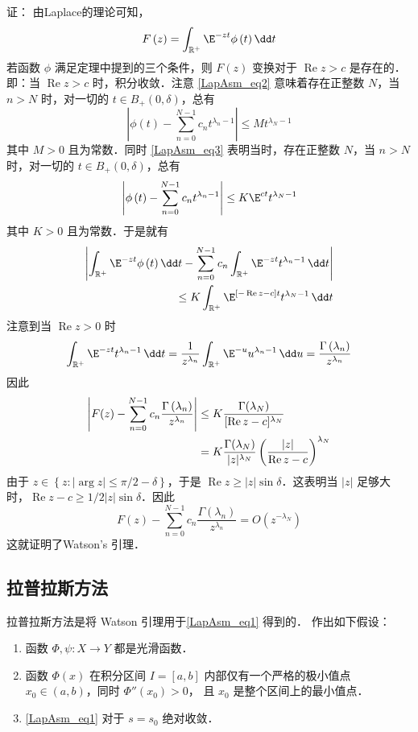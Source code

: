 证：
由Laplace的理论可知， 
\[
F\left(z\right)=\int_{\mathbb{R}^+}{\E^{-zt}\phi\left(t\right)}\,\dd t
\]
若函数 $\phi$ 满足定理中提到的三个条件，则 $F(z)$ 变换对于 $\operatorname{Re} z>c$ 是存在的．即：当 $\operatorname{Re} z>c$ 时，积分收敛．注意 \autoref{LapAsm_eq2} 意味着存在正整数 $N$，当 $n>N$ 时，对一切的 $t\in B_{+}(0,\delta)$，总有
\[
  \left|\phi\left(t\right)-\sum_{n=0}^{N-1}{c_nt^{\lambda_n-1}}\right|\le Mt^{\lambda_N-1}
\]
其中 $M>0$ 且为常数．同时 \autoref{LapAsm_eq3} 表明当时，存在正整数 $N$，当 $n>N$ 时，对一切的 $t\in B_{+}(0,\delta)$，总有
\[
  \left|\phi\left(t\right)-\sum_{n=0}^{N-1}{c_nt^{\lambda_n-1}}\right|\le K\E^{ct}t^{\lambda_N-1}
\]
其中 $K>0$ 且为常数．于是就有
\begin{align*}
  \left|\int_{\mathbb{R}^+}{\E^{-zt}\phi\left(t\right)}\,\dd t-\sum_{n=0}^{N-1}{c_n\int_   {\mathbb{R}^+}{\E^{-zt}t^{\lambda_n-1}}\,\dd t}\right|\\
  \le K\int_{\mathbb{R}^+}\E^{[-\operatorname{Re}z-c]t}t^{\lambda_N-1}\,\dd t
\end{align*}
注意到当 $\operatorname{Re}z>0$ 时
\[
  \int_{\mathbb{R}^+}{\E^{-zt}t^{\lambda_n-1}}\,\dd t
  =\frac{1}{z^{\lambda_n}}\int_{\mathbb{R}^+}{\E^{-u}u^{\lambda_n-1}}\,\dd u
  =\frac{\Gamma\left(\lambda_n\right)}{z^{\lambda_n}}
\]
因此
\begin{align*}
  \left|F(z)-\sum_{n=0}^{N-1}{c_n\frac{\Gamma\left(\lambda_n\right)}{z^{\lambda_n}}}\right|
  &\le K {\Gamma(\lambda_{N})\over \operatorname{[Re}z-c]^{\lambda_N}}\nonumber\\
  &=K{\Gamma(\lambda_{N})\over |z|^{\lambda_N}}\left(|z|\over \operatorname{Re}z-c\right)^{\lambda_N}\nonumber
\end{align*}
由于 $z\in{\left\{z:\left|\arg{z}\right|\le\pi/2-\delta\right\}}$，于是 $\operatorname{Re}z\geq |z|\sin \delta$．这表明当 $\left|z\right|$ 足够大时，$\operatorname{Re}z-c\geqslant1/2|z|\sin \delta$．因此
\[
F\left(z\right)-\sum_{n=0}^{N-1}{c_n\frac{\Gamma\left(\lambda_n\right)}{z^{\lambda_n}}}=O\left(z^{-\lambda_N}\right)
\]
这就证明了Watson's 引理．

\subsection{拉普拉斯方法}
拉普拉斯方法是将 Watson 引理用于\autoref{LapAsm_eq1} 得到的． 作出如下假设：

\begin{enumerate}
  \item 函数 $\Phi,\psi:X\to Y$ 都是光滑函数．
  \item 函数 $\Phi(x)$ 在积分区间 $I=[a,b]$ 内部仅有一个严格的极小值点 $x_0\in(a,b)$，同时 $\Phi''(x_0)>0$， 且 $x_0$ 是整个区间上的最小值点．

  \item \autoref{LapAsm_eq1} 对于 $s=s_0$ 绝对收敛．
\end{enumerate}

